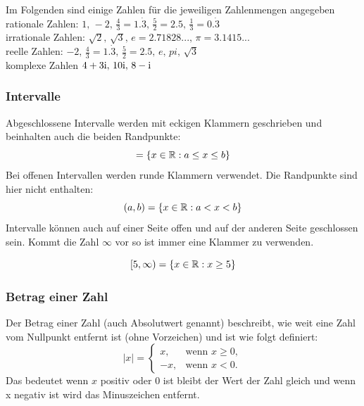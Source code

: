 \begin{bsp} Im Folgenden sind einige Zahlen für die jeweiligen Zahlenmengen angegeben \vspace{5pt}\\
rationale Zahlen: \(1,\,-2,\,\frac{4}{3}=1.\dot{3},\,\frac{5}{2}=2.5,\,\frac{1}{3}=0.\dot{3}\) \vspace{3pt}\\
irrationale Zahlen: \(\sqrt{2},\,\sqrt{3},\,e=2.71828...,\,\pi=3.1415...\) \vspace{3pt}\\
reelle Zahlen: \(-2,\,\frac{4}{3}=1.\dot{3},\,\frac{5}{2}=2.5,\,e,\,pi,\,\sqrt{3}\) \vspace{3pt}\\
komplexe Zahlen \(4+3\mathrm{i},\, 10\mathrm{i},\, 8-\mathrm{i}\)
\end{bsp}

\subsubsection{Intervalle}
Abgeschlossene Intervalle werden mit eckigen Klammern geschrieben und beinhalten auch die beiden Randpunkte:
\begin{equation}
    [a,b] = \{x \in \R : a \leq x \leq b\}
\end{equation}
Bei offenen Intervallen werden runde Klammern verwendet. Die Randpunkte sind hier nicht enthalten:
\begin{equation}
    (a,b) = \{x \in \mathbb{R} : a < x < b\}
\end{equation}
Intervalle können auch auf einer Seite offen und auf der anderen Seite geschlossen sein. Kommt die Zahl $\infty$ vor so ist immer eine Klammer zu verwenden.
\begin{bsp}
    \begin{equation*}
        [5,\infty) = \{ x \in \mathbb{R} : x \geq 5 \}
    \end{equation*}
\end{bsp}
\subsubsection{Betrag einer Zahl}
Der Betrag einer Zahl (auch Absolutwert genannt) beschreibt, wie weit eine Zahl vom Nullpunkt entfernt ist (ohne Vorzeichen) und ist wie folgt definiert:
\begin{equation}
    |x| =
    \begin{cases}
        x, & \text{wenn } x \ge 0, \\
        -x, & \text{wenn } x < 0.
    \end{cases}
\end{equation}
Das bedeutet wenn \(x\) positiv oder 0 ist bleibt der Wert der Zahl gleich und wenn x negativ ist wird das Minuszeichen entfernt.

